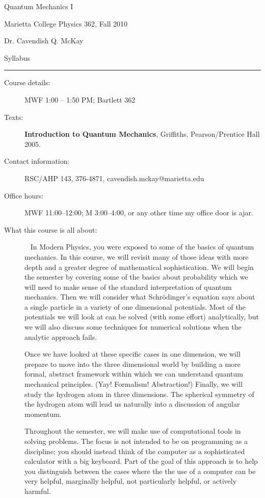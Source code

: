 \documentclass{article}
\begin{document}
\centerline{\Large Quantum Mechanics I}
\vskip0.1cm\centerline{\large Marietta College Physics 362, Fall 2010}
\vskip0.1cm\centerline{Dr. Cavendish Q. McKay}
\vskip 0.25cm
\centerline{Syllabus}
\vskip0.1cm\hrule\vskip0.5cm
\begin{description}
\item[Course details:] MWF 1:00 -- 1:50 PM; Bartlett 362
\item[Texts:] {\bf Introduction to Quantum Mechanics},
  Griffiths, Pearson/Prentice Hall 2005.
\item[Contact information:] RSC/AHP 143, 376-4871,
  cavendish.mckay@marietta.edu
\item[Office hours:] MWF 11:00--12:00; M 3:00--4:00, or any other time my office
  door is ajar.

\item[What this course is all about:] {\ } \newline In Modern Physics,
  you were exposed to some of the basics of quantum mechanics.  In
  this course, we will revisit many of those ideas with more depth and
  a greater degree of mathematical sophistication. We will begin the
  semester by covering some of the basics about probability which we
  will need to make sense of the standard interpretation of quantum
  mechanics.  Then we will consider what Schr\"odinger's equation
  says about a single particle in a variety of one dimensional
  potentials. Most of the potentials we will look at can be solved
  (with some effort) analytically, but we will also discuss some
  techniques for numerical solutions when the analytic approach fails.

  Once we have looked at these specific cases in one dimension, we
  will prepare to move into the three dimensional world by building a
  more formal, abstract framework within which we can understand
  quantum mechanical principles. (Yay! Formalism! Abstraction!)
  Finally, we will study the hydrogen atom in three dimensions.  The
  spherical symmetry of the hydrogen atom will lead us naturally into
  a discussion of angular momentum.

  Throughout the semester, we will make use of computational tools in
  solving problems. The focus is not intended to be on programming as
  a discipline; you should instead think of the computer as a
  sophisticated calculator with a big keyboard. Part of the goal of
  this approach is to help you distinguish between the cases where the
  the use of a computer can be very helpful, marginally helpful, not
  particularly helpful, or actively harmful.
  

\end{description}
\end{document}
